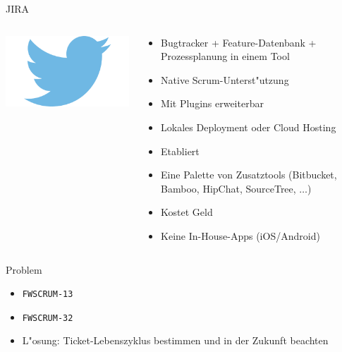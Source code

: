 \documentclass{beamer}
\newcommand{\cmark}{\ding{51}}
\newcommand{\xmark}{\ding{55}}
\begin{document}
\begin{frame}{JIRA}
\begin{columns}[T]
\begin{column}{.33\linewidth}
			\vfill
			\begin{center}
				\includegraphics[scale=.2]{jira-twitter.png}
			\end{center}
		\end{column}
		\hfill
		\begin{column}{.66\linewidth}
			\begin{itemize}
				\item[\cmark] Bugtracker + Feature-Datenbank + Prozessplanung in einem Tool
				\item[\cmark] Native Scrum-Unterst"utzung
				\item[\cmark] Mit Plugins erweiterbar
				\item[\cmark] Lokales Deployment oder Cloud Hosting
				\item[\cmark] Etabliert
				\item[\cmark] Eine Palette von Zusatztools (Bitbucket, Bamboo, HipChat, SourceTree, $\ldots$)
				\item[\xmark] Kostet Geld
				\item[\xmark] Keine In-House-Apps (iOS/Android)
			\end{itemize}
		\end{column}
	\end{columns}
\end{frame}

\begin{frame}{Problem}
	\begin{itemize}
		\item \texttt{FWSCRUM-13}
		\item \texttt{FWSCRUM-32}
		\item L"osung: Ticket-Lebenszyklus bestimmen und in der Zukunft beachten
	\end{itemize}
\end{frame}
\end{document}
